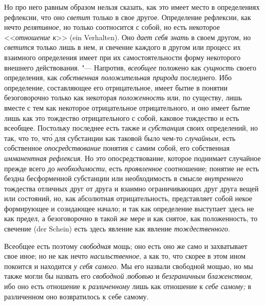 Но про него равным образом нельзя сказать, как это имеет место в определениях
рефлексии, что оно {\em светит} только в свое другое. Определение рефлексии,
как нечто {\em релятивное}, но только соотносится с собой, но есть некоторое
<<{\em отношение к}>> (ein Verhalten). Оно {\em дает себя знать} в своем
другом, но {\em светится} только лишь в нем, и свечение каждого в другом или
процесс их взаимного определения имеет при их самостоятельности форму
некоторого внешнего действования. "--- Напротив, {\em всеобщее} положено как
{\em сущность} своего определения, как {\em собственная положительная природа}
последнего. Ибо определение, составляющее его отрицательное, имеет бытие в
понятии безоговорочно только как некоторая {\em положенность} или, по существу,
лишь вместе с тем как некоторое отрицательное отрицательного, и оно имеет бытие
лишь как это тождество отрицательного с собой, каковое тождество и есть
всеобщее. Постольку последнее есть также и {\em субстанция} своих определений,
но так, что то, чт\'{о} для субстанции как таковой было чем-то {\em случайным},
есть собственное {\em опосредствование} понятия с самим собой, его собственная
{\em имманентная рефлексия}. Но это опосредствование, которое поднимает
случайное прежде всего до {\em необходимости}, есть {\em проявленное}
соотношение; понятие не есть бездна бесформенной субстанции или необходимость в
смысле {\em внутреннего} тождества отличных друг от друга и взаимно
ограничивающих друг друга вещей или состояний, но, как абсолютная отрицательность,
представляет собой некое формирующее и созидающее начало; и так как определение
выступает здесь не как предел, а безоговорочно в такой же мере и как снятое,
как положенность, то свечение (der Schein) есть здесь явление как явление
{\em тождественного}.

Всеобщее есть поэтому {\em свободная} мощь; оно есть оно же само и захватывает
свое иное; но не как нечто {\em насильственное}, а как то, что скорее в этом
ином покоится и находится {\em у себя самого}. Мы его назвали свободной мощью,
но мы также могли бы назвать его {\em свободной любовью} и {\em безграничным
блаженством}, ибо оно есть отношение к {\em различенному} лишь как отношение
к {\em себе самому;} в различенном оно возвратилось к себе самому.

